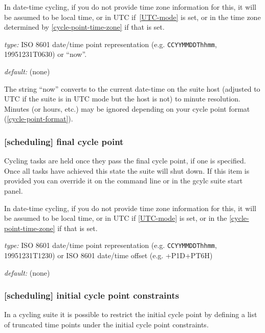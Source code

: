 In date-time cycling, if you do not provide time zone information for this,
it will be assumed to be local time, or in UTC if~\ref{UTC-mode} is set, or in
the time zone determined by \ref{cycle-point-time-zone} if that is set.

\begin{myitemize}
    \item {\em type:} ISO 8601 date/time point representation (e.g.
 \lstinline=CCYYMMDDThhmm=, 19951231T0630) or ``now''.
    \item {\em default:} (none)
\end{myitemize}

The string ``now'' converts to the current date-time on the suite host (adjusted
to UTC if the suite is in UTC mode but the host is not) to minute resolution.
Minutes (or hours, etc.) may be ignored depending on your cycle point format
(\ref{cycle-point-format}).

\subsubsection[final cycle point]{[scheduling] \textrightarrow final cycle point}

Cycling tasks are held once they pass the final cycle point, if one is
specified. Once all tasks have achieved this state the suite will shut
down. If this item is provided you can override it on the command line
or in the gcylc suite start panel.

In date-time cycling, if you do not provide time zone information for this,
it will be assumed to be local time, or in UTC if \ref{UTC-mode} is set, or in
the \ref{cycle-point-time-zone} if that is set.

\begin{myitemize}
    \item {\em type:} ISO 8601 date/time point representation (e.g.
 \lstinline=CCYYMMDDThhmm=, 19951231T1230) or ISO 8601 date/time offset
    (e.g. +P1D+PT6H)
    \item {\em default:} (none)
\end{myitemize}

\subsubsection[initial cycle point constraints]{[scheduling] \textrightarrow initial cycle point constraints}
\label{initial cycle point constraints}

In a cycling suite it is possible to restrict the initial cycle point by
defining a list of truncated time points under the initial cycle point
constraints.

